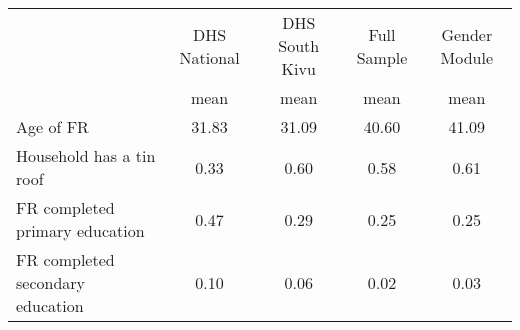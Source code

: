 {
\def\sym#1{\ifmmode^{#1}\else\(^{#1}\)\fi}
\begin{tabular}{l*{4}{c}}
\hline\hline
                    &\multicolumn{1}{c}{DHS National}&\multicolumn{1}{c}{DHS South Kivu}&\multicolumn{1}{c}{Full Sample}&\multicolumn{1}{c}{Gender Module}\\
                    &        mean&        mean&        mean&        mean\\
\hline
Age of FR           &       31.83&       31.09&       40.60&       41.09\\
Household has a tin roof&        0.33&        0.60&        0.58&        0.61\\
FR completed primary education&        0.47&        0.29&        0.25&        0.25\\
FR completed secondary education&        0.10&        0.06&        0.02&        0.03\\
\hline\hline
\end{tabular}
}
